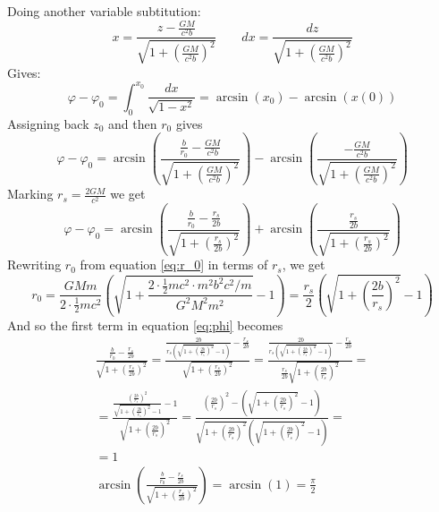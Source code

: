 \documentclass{article}
\begin{document}
Doing another variable subtitution:
\begin{equation}
    x = \frac{z - \frac{GM}{c^2b}}{\sqrt{1 + \left(\frac{GM}{c^2b}\right)^2}}
    \qquad
    dx = \frac{dz}{\sqrt{1 + \left(\frac{GM}{c^2b}\right)^2}}
\end{equation}
Gives:
\begin{equation}
    \varphi - \varphi_0
    = \int_0^{x_0} \frac{dx}{\sqrt{1 - x^2}} = \arcsin(x_0) - \arcsin(x(0))
\end{equation}
Assigning back $z_0$ and then $r_0$ gives
\begin{equation}
    \varphi - \varphi_0 = \arcsin\left(
        \frac{\frac{b}{r_0} - \frac{GM}{c^2b}}{\sqrt{1 + \left(\frac{GM}{c^2b}\right)^2}}
    \right)
     - \arcsin\left(\frac{-\frac{GM}{c^2b}}{\sqrt{1 + \left(\frac{GM}{c^2b}\right)^2}}\right)
\end{equation}
Marking $r_s = \frac{2GM}{c^2}$ we get
\begin{equation}
\label{eq:phi}
    \varphi - \varphi_0 = \arcsin\left(
        \frac{\frac{b}{r_0} - \frac{r_s}{2b}}{\sqrt{1 + \left(\frac{r_s}{2b}\right)^2}}
    \right)
     + \arcsin\left(\frac{\frac{r_s}{2b}}{\sqrt{1 + \left(\frac{r_s}{2b}\right)^2}}\right)
\end{equation}
Rewriting $r_0$ from equation \ref{eq:r_0} in terms of $r_s$, we get
\begin{equation}
    r_0 = \frac{GMm}{2\cdot\frac{1}{2}mc^2}\left(
        \sqrt{1+\frac{2\cdot\frac{1}{2}mc^2\cdot m^2b^2c^2/m}{G^2M^2m^2}}-1
    \right) = 
    \frac{r_s}{2}\left(\sqrt{1+\left(\frac{2b}{r_s}\right)^2}-1\right)
\end{equation}
And so the first term in equation \ref{eq:phi} becomes
\begin{equation}
\begin{gathered}
    \frac{\frac{b}{r_0} - \frac{r_s}{2b}}{\sqrt{1 + \left(\frac{r_s}{2b}\right)^2}} =
    \frac{\frac{2b}{r_s\left(\sqrt{1+\left(\frac{2b}{r_s}\right)^2}-1\right)} - \frac{r_s}{2b}}{\sqrt{1 + \left(\frac{r_s}{2b}\right)^2}} = 
    \frac{\frac{2b}{r_s\left(\sqrt{1+\left(\frac{2b}{r_s}\right)^2}-1\right)} - \frac{r_s}{2b}}{\frac{r_s}{2b}\sqrt{1 + \left(\frac{2b}{r_s}\right)^2}} =
    \\
    = \frac{\frac{\left(\frac{2b}{r_s}\right)^2}{\sqrt{1+\left(\frac{2b}{r_s}\right)^2}-1} - 1}{\sqrt{1 + \left(\frac{2b}{r_s}\right)^2}} =
    \frac{\left(\frac{2b}{r_s}\right)^2 - \left(\sqrt{1+\left(\frac{2b}{r_s}\right)^2}-1\right)}{\sqrt{1 + \left(\frac{2b}{r_s}\right)^2}\left(\sqrt{1+\left(\frac{2b}{r_s}\right)^2}-1\right)} =
    \\
    = 1
    \\
    \arcsin\left(\frac{\frac{b}{r_0} - \frac{r_s}{2b}}{\sqrt{1 + \left(\frac{r_s}{2b}\right)^2}}\right) = \arcsin(1) = \frac{\pi}{2}
\end{gathered}
\end{equation}
\end{document}
